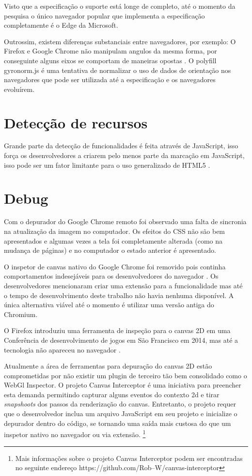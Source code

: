 Visto que a especificação o suporte está longe de completo, até
o momento da pesquisa o único navegador popular que implementa a
especificação completamente é o Edge da Microsoft.

Outrossim, existem diferenças substanciais entre navegadores, por
exemplo: O Firefox e Google Chrome não manipulam angulos da mesma
forma, por conseguinte alguns eixos se comportam de maneiras opostas
\autocite{mdnOrientation}. O polyfill gyronorm.js é uma tentativa de
normalizar o uso de dados de orientação nos navegadores que pode ser
utilizada até a especificação e os navegadores evoluírem.

\section{Detecção de recursos}

Grande parte da detecção de funcionalidades é feita através de
JavaScript, isso força os desenvolvedores a criarem pelo menos parte da
marcação em JavaScript, isso pode ser um fator limitante para o uso
generalizado de HTML5 \autocite{diveIntohtml}.


\section{Debug}

Com o depurador do Google Chrome remoto foi observado uma falta de
sincronia na atualização da imagem no computador. Os efeitos do CSS
não são bem apresentados e algumas vezes a tela foi completamente
alterada (como na mudança de páginas) e no computador o estado
anterior é apresentado.

O inspetor de canvas nativo do Google Chrome foi removido pois continha
comportamentos indesejáveis para os desenvolvedores do navegador
\autocite{canvasinspector}. Os desenvolvedores mencionaram criar uma
extensão para a funcionalidade mas até o tempo de desenvolvimento
deste trabalho não havia nenhuma disponível. A única alternativa
viável até o momento é utilizar uma versão antiga do Chromium.

O Firefox introduziu uma ferramenta de inspeção para o canvas 2D
em uma Conferência de desenvolvimento de jogos em São Francisco em 2014,
mas até a tecnologia não apareceu no navegador \autocite{firefoxCanvasDebug}.

Atualmente a área de ferramentas para depuração do canvas 2D estão
comprometidas por não existir um plugin de terceiro tão bem
consolidado como o WebGl Inspector. O projeto Canvas Interceptor é
uma iniciativa para preencher esta demanda permitindo capturar alguns
eventos do contexto 2d e tirar \textit{snapshoots} dos passos da renderização
do canvas. Entretanto, o projeto requer que o desenvolvedor inclua
um arquivo JavaScript em seu projeto e inicialize o depurador dentro do código,
se tornando uma saída mais custosa do que um inspetor nativo no
navegador ou via extensão. \footnote{Mais informações sobre o
projeto Canvas Interceptor podem ser encontradas no seguinte endereço
https://github.com/Rob--W/canvas-interceptor}

